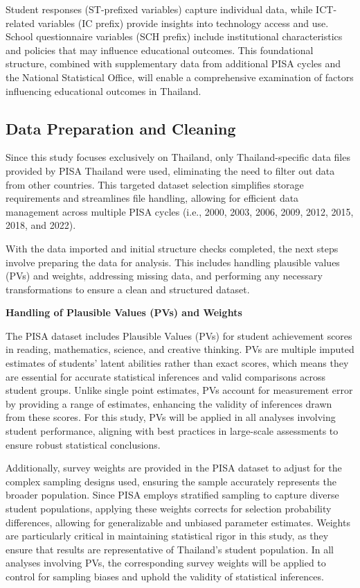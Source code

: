 \documentclass[
]{article}
\begin{document}
Student responses (ST-prefixed variables) capture individual data, while
ICT-related variables (IC prefix) provide insights into technology
access and use. School questionnaire variables (SCH prefix) include
institutional characteristics and policies that may influence
educational outcomes. This foundational structure, combined with
supplementary data from additional PISA cycles and the National
Statistical Office, will enable a comprehensive examination of factors
influencing educational outcomes in Thailand.

\hypertarget{data-preparation-and-cleaning}{%
\subsection{Data Preparation and
Cleaning}\label{data-preparation-and-cleaning}}

Since this study focuses exclusively on Thailand, only Thailand-specific
data files provided by PISA Thailand were used, eliminating the need to
filter out data from other countries. This targeted dataset selection
simplifies storage requirements and streamlines file handling, allowing
for efficient data management across multiple PISA cycles (i.e., 2000,
2003, 2006, 2009, 2012, 2015, 2018, and 2022).

With the data imported and initial structure checks completed, the next
steps involve preparing the data for analysis. This includes handling
plausible values (PVs) and weights, addressing missing data, and
performing any necessary transformations to ensure a clean and
structured dataset.

\textbf{Handling of Plausible Values (PVs) and Weights}

The PISA dataset includes Plausible Values (PVs) for student achievement
scores in reading, mathematics, science, and creative thinking. PVs are
multiple imputed estimates of students' latent abilities rather than
exact scores, which means they are essential for accurate statistical
inferences and valid comparisons across student groups. Unlike single
point estimates, PVs account for measurement error by providing a range
of estimates, enhancing the validity of inferences drawn from these
scores. For this study, PVs will be applied in all analyses involving
student performance, aligning with best practices in large-scale
assessments to ensure robust statistical conclusions.

Additionally, survey weights are provided in the PISA dataset to adjust
for the complex sampling designs used, ensuring the sample accurately
represents the broader population. Since PISA employs stratified
sampling to capture diverse student populations, applying these weights
corrects for selection probability differences, allowing for
generalizable and unbiased parameter estimates. Weights are particularly
critical in maintaining statistical rigor in this study, as they ensure
that results are representative of Thailand's student population. In all
analyses involving PVs, the corresponding survey weights will be applied
to control for sampling biases and uphold the validity of statistical
inferences.
\end{document}
